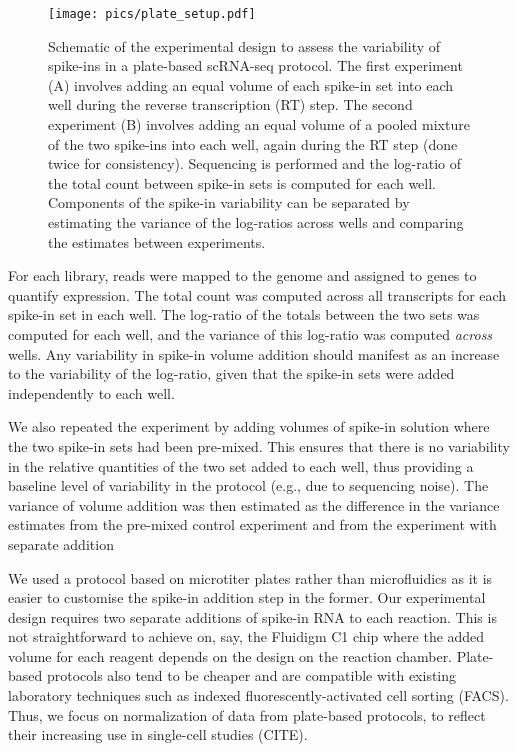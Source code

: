 \documentclass{article}
\begin{document}
\begin{figure}[tbp]
\begin{center}
\texttt{[image: pics/plate\_setup.pdf]}
\end{center}
\caption{Schematic of the experimental design to assess the variability of spike-ins in a plate-based scRNA-seq protocol.
The first experiment (A) involves adding an equal volume of each spike-in set into each well during the reverse transcription (RT) step.
The second experiment (B) involves adding an equal volume of a pooled mixture of the two spike-ins into each well, again during the RT step (done twice for consistency).
Sequencing is performed and the log-ratio of the total count between spike-in sets is computed for each well.
Components of the spike-in variability can be separated by estimating the variance of the log-ratios across wells and comparing the estimates between experiments.
}
\label{fig:expdesign}
\end{figure}

For each library, reads were mapped to the genome and assigned to genes to quantify expression.
The total count was computed across all transcripts for each spike-in set in each well.
The log-ratio of the totals between the two sets was computed for each well, and the variance of this log-ratio was computed \textit{across} wells.
Any variability in spike-in volume addition should manifest as an increase to the variability of the log-ratio, given that the spike-in sets were added independently to each well.

We also repeated the experiment by adding volumes of spike-in solution where the two spike-in sets had been pre-mixed.
This ensures that there is no variability in the relative quantities of the two set added to each well, thus providing a baseline level of variability in the protocol (e.g., due to 
sequencing noise).
The variance of volume addition was then estimated as the difference in the variance estimates from the pre-mixed control experiment and from the experiment with separate addition

We used a protocol based on microtiter plates rather than microfluidics as it is easier to customise the spike-in addition step in the former.
Our experimental design requires two separate additions of spike-in RNA to each reaction.
This is not straightforward to achieve on, say, the Fluidigm C1 chip where the added volume for each reagent depends on the design on the reaction chamber.
Plate-based protocols also tend to be cheaper and are compatible with existing laboratory techniques such as indexed fluorescently-activated cell sorting (FACS).
Thus, we focus on normalization of data from plate-based protocols, to reflect their increasing use in single-cell studies (CITE).
\end{document}
